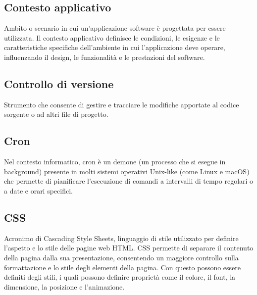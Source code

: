 \hypertarget{sec:contesto_applicativo}{}
\subsection*{Contesto applicativo}
Ambito o scenario in cui un'applicazione software è progettata per essere utilizzata. Il contesto applicativo definisce le condizioni, le esigenze e le
caratteristiche specifiche dell'ambiente in cui l'applicazione deve operare, influenzando il design, le funzionalità e le prestazioni del software.

\hypertarget{sec:controllo_versione}{}
\subsection*{Controllo di versione}
Strumento che consente di gestire e tracciare le modifiche apportate al codice sorgente o ad altri file di progetto.

\hypertarget{sec:cron}{}
\subsection*{Cron}
Nel contesto informatico, cron è un demone (un processo che si esegue in background) presente in molti sistemi operativi Unix-like 
(come Linux e macOS) che permette di pianificare l'esecuzione di comandi a intervalli di tempo regolari o a date e orari specifici.

\hypertarget{sec:css}{}
\subsection*{CSS}
Acronimo di Cascading Style Sheets, linguaggio di stile utilizzato per definire l’aspetto e lo stile delle pagine web HTML. CSS 
permette di separare il contenuto della pagina dalla sua presentazione, consentendo un maggiore controllo sulla formattazione e lo 
stile degli elementi della pagina. Con questo possono essere definiti degli stili, i quali possono definire proprietà come il colore, 
il font, la dimensione, la posizione e l’animazione.

\newpage